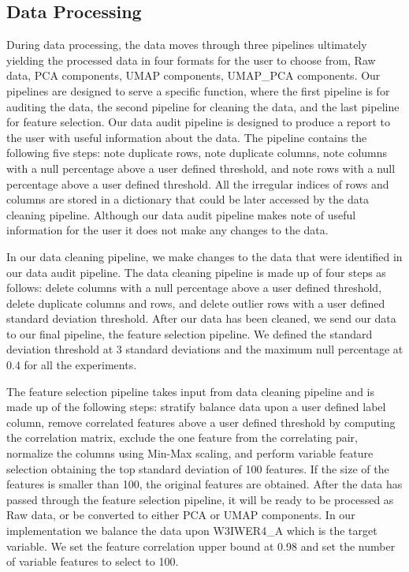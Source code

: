 \subsection{Data Processing}
During data processing, the data moves through three pipelines ultimately yielding the processed data in four formats for the user to choose from, Raw data, PCA components, UMAP components, UMAP\_PCA components. Our pipelines are designed to serve a specific function, where the first pipeline is for auditing the data, the second pipeline for cleaning the data, and the last pipeline for feature selection. Our data audit pipeline is designed to produce a report to the user with useful information about the data. The pipeline contains the following five steps: note duplicate rows, note duplicate columns, note columns with a null percentage above a user defined threshold, and note rows with a null percentage above a user defined threshold. All the irregular indices of rows and columns are stored in a dictionary that could be later accessed by the data cleaning pipeline. Although our data audit pipeline makes note of useful information for the user it does not make any changes to the data.

In our data cleaning pipeline, we make changes to the data that were identified in our data audit pipeline. The data cleaning pipeline is made up of four steps as follows: delete columns with a null percentage above a user defined threshold, delete duplicate columns and rows, and delete outlier rows with a user defined standard deviation threshold. After our data has been cleaned, we send our data to our final pipeline, the feature selection pipeline. We defined the standard deviation threshold at 3 standard deviations and the maximum null percentage at 0.4 for all the experiments.

The feature selection pipeline takes input from data cleaning pipeline and is made up of the following steps: stratify balance data upon a user defined label column, remove correlated features above a user defined threshold by computing the correlation matrix, exclude the one feature from the correlating pair, normalize the columns using Min-Max scaling, and perform variable feature selection obtaining the top standard deviation of 100 features. If the size of the features is smaller than 100, the original features are obtained. After the data has passed through the feature selection pipeline, it will be ready to be processed as Raw data, or be converted to either PCA or UMAP components. In our implementation we balance the data upon W3IWER4\_A which is the target variable. We set the feature correlation upper bound at 0.98 and set the number of variable features to select to 100.

